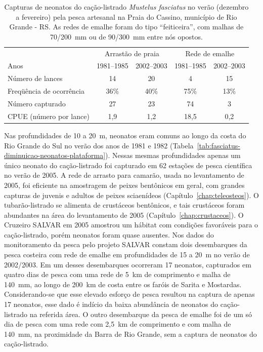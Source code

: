 \documentclass[a4paper,11pt,twoside,showtrims,onecolumn,openright,final]{memoir}
\begin{document}
\begin{table}
\caption[Capturas de neonatos do cação-listrado \emph{Mustelus fasciatus} no verão pela pesca artesanal na Praia do Cassino]
        {Capturas de neonatos do cação-listrado \emph{Mustelus fasciatus} no verão (dezembro a fevereiro) 
         pela pesca artesanal na Praia do Cassino, município de Rio Grande - RS. 
	 As redes de emalhe foram do tipo ``feiticeira'', com malhas de 70/200~mm 
	 ou de 90/300~mm entre nós opostos.}  
\label{tab:fasciatus-diminuicao-neonatos-praia}
\begin{small}
\begin{tabularx}{\textwidth}{Xcccc}
\toprule
			& \multicolumn{2}{c}{Arrastão de praia}	& \multicolumn{2}{c}{Rede de emalhe}	\\
\cmidrule(r){2-3} \cmidrule(l){4-5}
Anos 			& 1981--1985	& 2002--2003	& 1981--1985	& 2002--2003	\\
\midrule
Número de lances	& 14		& 20		& 4		& 15		\\
Freqüência de 
ocorrência		& 36\%		& 40\%		& 75\%		& 13\%		\\
Número capturado	& 27		& 23		& 74		& 3		\\
CPUE (número por lance) & 1,9		& 1,2		& 18,5		& 0,2		\\
\bottomrule
\end{tabularx}
\end{small}
\end{table}


Nas profundidades de 10 a 20~m, neonatos eram comuns ao longo da costa do Rio Grande do Sul 
no verão dos anos de 1981 e 1982 (Tabela~\ref{tab:fasciatus-diminuicao-neonatos-plataforma}). 
Nessas mesmas profundidades apenas um único neonato do cação-listrado foi capturado 
em 62 estações de pesca científica no verão de 2005. A rede de arrasto para camarão, 
usada no levantamento de 2005, foi eficiente na amostragem  de peixes bentônicos em geral, 
com grandes capturas de juvenis e adultos de peixes sciaenídeos (Capítulo~\ref{chap:teleosteos}). %
O tubarão-listrado se alimenta de crustáceos bentônicos, e tais crustáceos foram abundantes na 
área do levantamento de 2005 (Capítulo~\ref{chap:crustaceos}). %
O Cruzeiro SALVAR em 2005 amostrou um hábitat com condições favoráveis para o cação-listrado, 
porém neonatos foram quase ausentes. Nos dados do monitoramento da pesca pelo projeto SALVAR 
constam dois desembarques da pesca costeira com rede de emalhe em profundidades de 15 a 20~m 
no verão de 2002/2003. Em um desses desembarques ocorreram 17 neonatos, capturados em quatro 
dias de pesca com uma rede de 5~km de comprimento e malha de 140~mm, ao longo de  200~km de 
costa entre os faróis de Sarita e Mostardas. Considerando-se que esse elevado esforço de 
pesca resultou na captura de apenas 17 neonatos, esse dado é indício da baixa abundância 
de neonatos do cação-listrado na referida área. O outro desembarque da pesca de emalhe 
foi de um só dia de pesca com uma rede com 2,5~km de comprimento e com malha de 140~mm, 
na proximidade da Barra de Rio Grande, sem a captura de neonatos do cação-listrado. 
\end{document}
